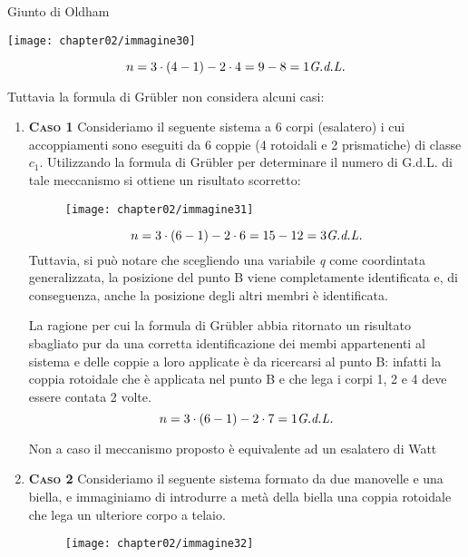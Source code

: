\begin{itemize}
				Giunto di Oldham\newline
				\begin{minipage}{.25\textwidth}
					\centering
					\texttt{[image: chapter02/immagine30]}
				\end{minipage}
				\hfill
				\begin{minipage}{.75\textwidth}
				\begin{equation*}
					n = 3 \cdot (4 - 1) - 2 \cdot 4 = 9 - 8 = 1 \emph{G.d.L.}
				\end{equation*}
				\end{minipage}
		
	\end{itemize}
	\newpage
	
	Tuttavia la formula di Gr\"ubler non considera alcuni casi:
	\begin{enumerate}
	\item {\scshape{\bfseries Caso 1}} \newline
		Consideriamo il seguente sistema a 6 corpi (esalatero) i cui accoppiamenti sono eseguiti da 6 coppie (4 rotoidali e 2 prismatiche) di classe $c_1$.
		Utilizzando la formula di Gr\"ubler per determinare il numero di G.d.L. di tale meccanismo si ottiene un risultato scorretto:
\begin{figure}[h]
\centering
\texttt{[image: chapter02/immagine31]}
\end{figure}
		\begin{equation*}
			n = 3 \cdot (6 - 1) - 2 \cdot 6 = 15 - 12 = 3  \emph{G.d.L.} 
		\end{equation*}
	Tuttavia, si può notare che scegliendo una variabile \emph{q} come coordintata generalizzata, la posizione del punto B viene completamente identificata e, di conseguenza, anche la posizione degli altri membri è identificata.
	 
	 La ragione per cui la formula di Gr\"ubler abbia ritornato un risultato sbagliato pur da una corretta identificazione dei membi appartenenti al sistema e delle coppie a loro applicate è da ricercarsi al punto B: infatti la coppia rotoidale che è applicata nel punto B e che lega i corpi 1, 2 e 4 deve essere contata 2 volte.
	 \begin{equation*}
	 	n = 3 \cdot (6 - 1) - 2 \cdot 7 = 1 \emph{G.d.L.}
	 \end{equation*}
	
	Non a caso il meccanismo proposto è equivalente ad un esalatero di Watt
	
	\item {\scshape{\bfseries Caso 2}} \newline
		Consideriamo il seguente sistema formato da due manovelle e una biella, e immaginiamo di introdurre a metà della biella una coppia rotoidale che lega un ulteriore corpo a telaio.
		\begin{figure}[h]
		\centering
		\texttt{[image: chapter02/immagine32]}
		\end{figure}
		

\end{enumerate}
